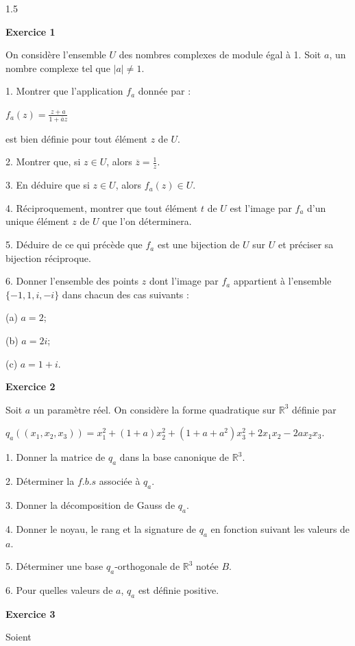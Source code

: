 \documentclass[12pt]{article}
\begin{document}
\begin{spacing}{1.5}

 
 \textbf{Exercice 1}
 
  On considère l'ensemble $U$ des nombres complexes de module égal à 1. Soit $a$, un nombre
 complexe tel que $\mid a\mid\neq 1$.
 
 1. Montrer que l'application $f_a$ donnée par :
 
 $f_a(z) = \frac{z+a}{1+\overline{a}z} $
 
 est bien définie pour tout élément $z$ de $U$.
 
 2. Montrer que, si $z\in U$, alors $\overline{z} = \frac{1}{z}$.
 
 3. En déduire que si $z\in U$, alors $f_a(z)\in U$.
 
 4. Réciproquement, montrer que tout élément $t$ de $U$ est l'image par $f_a$ d'un unique élément
 $z$ de $U$ que l'on déterminera.
 
 5. Déduire de ce qui précède que $f_a$ est une bijection de $U$ sur $U$ et préciser sa bijection
 réciproque.
 
 6. Donner l'ensemble des points $z$ dont l'image par $f_a$ appartient à l'ensemble $\lbrace {-1,1,i,-i} \rbrace$ dans chacun des cas suivants :
 
 (a) $a = 2$;
 
 (b) $a = 2i$;
 
 (c) $a = 1+i$.
 
 \textbf{Exercice 2 }
 
  Soit $a$ un paramètre réel. On considère la forme quadratique sur $\mathbb{R}^3$ définie par
 
 $q_a((x_1,x_2,x_3)) = x^{2}_1 + (1 + a)x^{2}_2 + (1 + a+a^2)x^{2}_3 +2x_1x_2-2ax_2x_3$.
 
 1. Donner la matrice de $q_a$ dans la base canonique de $\mathbb{R}^3$.
 
 2. Déterminer la $f.b.s$ associée à $q_a$.
 
 3. Donner la décomposition de Gauss de $q_a$.
 
 4. Donner le noyau, le rang et la signature de $q_a$ en fonction suivant les valeurs de $a$.
 
 5. Déterminer une base $q_a$-orthogonale de $\mathbb{R}^3$ notée $B$.
 
 6. Pour quelles valeurs de $a$, $q_a$ est définie positive.
 
 \medskip\textbf{Exercice 3}
 
  Soient
 

\end{spacing}
\end{document}
